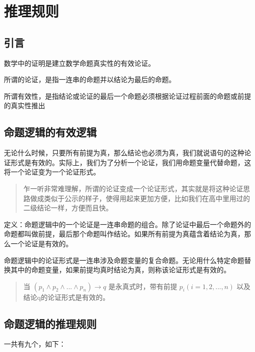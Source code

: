\documentclass[12pt,a4paper,oneside]{ctexart}
\begin{document}
\section*{推理规则}

\subsection*{引言}

数学中的证明是建立数学命题真实性的有效论证。

所谓的论证，是指一连串的命题并以结论为最后的命题。

所谓有效性，是指结论或论证的最后一个命题必须根据论证过程前面的命题或前提的真实性推出

\subsection*{命题逻辑的有效逻辑}

无论什么时候，只要所有前提为真，那么结论也必须为真，我们就说语句的这种论证形式是有效的。实际上，我们为了分析一个论证，我们用命题变量代替命题，这将一个论证变为一个论证形式。

\begin{quote}
乍一听非常难理解，所谓的论证变成一个论证形式，其实就是将这种论证思路做成类似于公示的样子，使得用起来更加方便，比如我们在高中里用过的二级结论一样，方便而且快。
\end{quote}

定义：命题逻辑中的一个论证是一连串命题的组合。除了论证中最后一个命题外的命题都叫做前提，最后那个命题叫作结论。如果所有前提为真蕴含着结论为真，那么一个论证是有效的。

命题逻辑中的论证形式是一连串涉及命题变量的复合命题。无论用什么特定命题替换其中的命题变量，如果前提均真时结论为真，则称该论证形式是有效的。

\begin{quote}
当 \((p_1\wedge p_2\wedge...\wedge p_n)\rightarrow q\) 是永真式时，带有前提 \(p_i(i=1,2,...,n)\) 以及结论q的论证形式是有效的。
\end{quote}

\subsection*{命题逻辑的推理规则}

一共有九个，如下：
\end{document}
